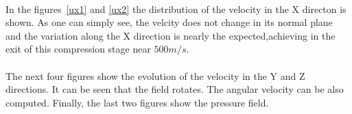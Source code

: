\paragraph{}In the figures~\ref{ux1} and \ref{ux2} the distribution of the velocity in the X directon is shown. As one can simply see, the velcity does not change in its normal plane and the variation along the X direction is nearly the expected,achieving in the exit of this compression stage near $500 m/s$. 
\paragraph{}The next four figures show the evolution of the velocity in the Y and Z directions. It can be seen that the field rotates. The angular velocity can be also computed. Finally, the last two figures show the pressure field.